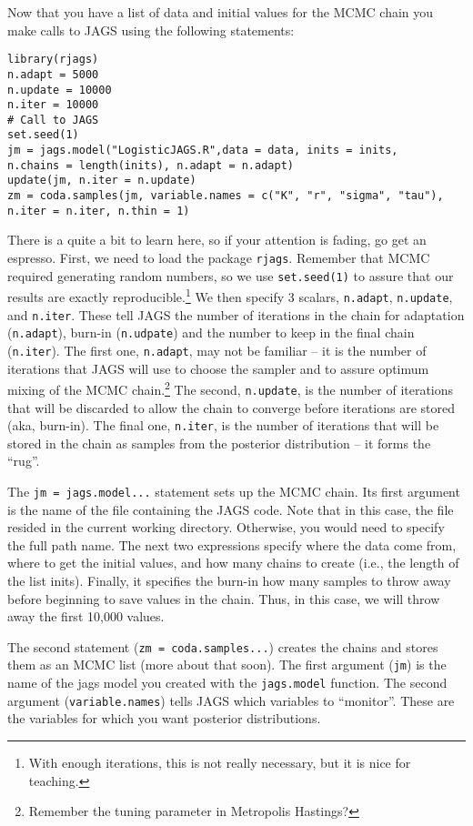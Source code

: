 \documentclass[12pt,english]{article}
\begin{document}
Now that you have a list of data and initial values for the MCMC chain you make calls to JAGS using the following statements:

\begin{Verbatim}
library(rjags)
n.adapt = 5000
n.update = 10000
n.iter = 10000
# Call to JAGS
set.seed(1)
jm = jags.model("LogisticJAGS.R",data = data, inits = inits, 
n.chains = length(inits), n.adapt = n.adapt)
update(jm, n.iter = n.update)
zm = coda.samples(jm, variable.names = c("K", "r", "sigma", "tau"),
n.iter = n.iter, n.thin = 1)
\end{Verbatim}

\noindent There is a quite a bit to learn here, so if your attention is fading, go get an espresso. First, we need to load the package \texttt{rjags}. Remember that MCMC required generating random numbers, so we use \texttt{set.seed(1)} to assure that our results are exactly reproducible.\footnote{With enough iterations, this is not really necessary, but it is nice for teaching.} We then specify 3 scalars, \texttt{n.adapt},  \texttt{n.update}, and \texttt{n.iter}. These tell JAGS the number of iterations in the chain for adaptation (\texttt{n.adapt}), burn-in (\texttt{n.udpate}) and the number to keep in the final chain (\texttt{n.iter}). The first one, \texttt{n.adapt}, may not be familiar -- it is the number of iterations that JAGS will use to choose the sampler and to assure optimum mixing of the MCMC chain.\footnote{Remember the tuning parameter in Metropolis Hastings?} The second, \texttt{n.update}, is the number of iterations that will be discarded to allow the chain to converge before iterations are stored (aka, burn-in). The final one, \texttt{n.iter}, is the number of iterations that will be stored in the chain as samples from the posterior distribution -- it forms the \enquote{rug}.

The \texttt{jm = jags.model...} statement sets up the MCMC chain. Its first argument is the name of the file containing the JAGS code. Note that in this case, the file resided in the current working directory. Otherwise, you would need to specify the full path name. The next two expressions specify where the data come from, where to get the initial values, and how many chains to create (i.e., the length of the list inits). Finally, it specifies the burn-in how many samples to throw away before beginning to save values in the chain. Thus, in this case, we will throw away the first 10,000 values.

The second statement (\texttt{zm = coda.samples...}) creates the chains and stores them as an MCMC list (more about that soon). The first argument (\texttt{jm}) is the name of the jags model you created with the \texttt{jags.model} function. The second argument (\texttt{variable.names}) tells JAGS which variables to \enquote{monitor}. These are the variables for which you want posterior distributions.
\end{document}
